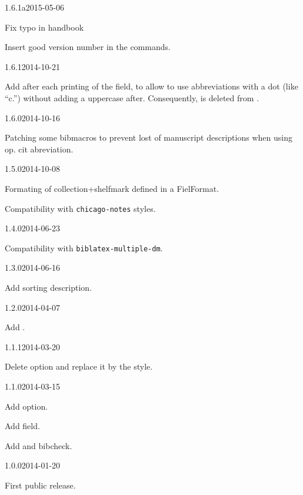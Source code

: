 \documentclass{ltxdockit}[2011/03/25]
\begin{document}
\begin{changelog}
\begin{release}{1.6.1a}{2015-05-06}
	\item Fix typo in handbook
	\item Insert good version number in the  commands.
\end{release}

\begin{release}{1.6.1}{2014-10-21}	
  	\item Add  after each printing of the  field, to allow to use abbreviations with a dot (like \enquote{c.}) without adding a uppercase after. Consequently,  is deleted from .
\end{release}

\begin{release}{1.6.0}{2014-10-16}	
  	\item Patching some bibmacros to prevent lost of manuscript descriptions when using  op. cit abreviation.
\end{release}

\begin{release}{1.5.0}{2014-10-08}	
  	\item Formating of collection+shelfmark defined in a FielFormat.
	\item Compatibility with \verb+chicago-notes+ styles.
\end{release}

\begin{release}{1.4.0}{2014-06-23}
	\item Compatibility with \verb+biblatex-multiple-dm+.
\end{release}


\begin{release}{1.3.0}{2014-06-16}
	\item Add sorting description.
\end{release}

\begin{release}{1.2.0}{2014-04-07}
	\item Add .
\end{release}

\begin{release}{1.1.1}{2014-03-20}
	\item Delete  option and replace it by the  style. 
\end{release}

\begin{release}{1.1.0}{2014-03-15}
\item Add  option.
\item Add  field.
\item Add  and  bibcheck. 
\end{release}

\begin{release}{1.0.0}{2014-01-20}
\item First public release.
\end{release}
\end{changelog}
\end{document}

